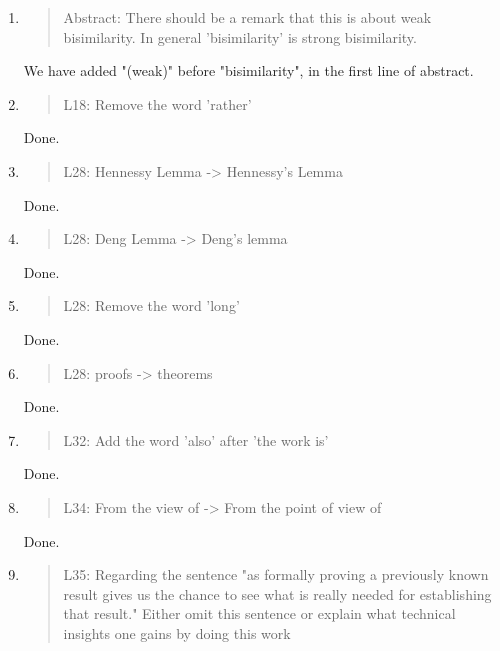 \begin{enumerate}
\item \begin{quote}
    Abstract:
    There should be a remark that this is about weak bisimilarity. In
    general 'bisimilarity' is strong bisimilarity.
  \end{quote}
  \Mark
  We have added "(weak)" before "bisimilarity", in the first line of abstract.

\item \begin{quote}
    L18: Remove the word 'rather'
  \end{quote}
  \Mark
 Done.
  
\item \begin{quote}
    L28: Hennessy Lemma -> Hennessy's Lemma
  \end{quote}
   \Mark
 Done.
  
\item \begin{quote}
    L28: Deng Lemma -> Deng's lemma
  \end{quote}
  \Mark
  Done.
  
\item \begin{quote}
    L28: Remove the word 'long'
  \end{quote}
  \Mark
  Done.
  
\item \begin{quote}
    L28: proofs -> theorems
  \end{quote}
  \Mark
  Done.
  
\item \begin{quote}
    L32: Add the word 'also' after 'the work is'
  \end{quote}
  \Mark
  Done.

\item \begin{quote}
    L34: From the view of -> From the point of view of
  \end{quote}
  \Mark
  Done.
  
\item \begin{quote}
    L35: Regarding the sentence "as formally proving a previously known result gives us the chance to see
    what is really needed for establishing that result."
    Either omit this sentence or explain what technical insights one
    gains by doing this work
  \end{quote}


\end{enumerate}
